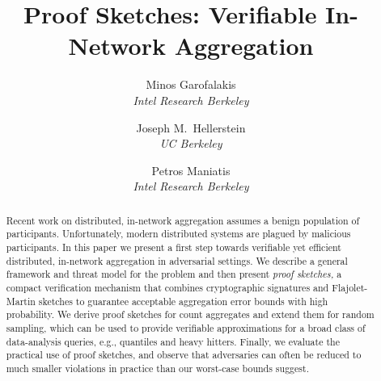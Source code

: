 \documentclass[10pt,twocolumn]{article}
\title{\vspace*{-32pt}Proof Sketches: Verifiable In-Network Aggregation}
\author{Minos Garofalakis\\
\emph{Intel Research Berkeley}\\
\and
Joseph M.\ Hellerstein\\
\emph{UC Berkeley}\\
\and
Petros Maniatis\\
\emph{Intel Research Berkeley}\\
}
\newcommand{\comm}[2]{[{\textbf{\color{green}#1:}}{\color{red}\textit{#2}}]}
\renewcommand{\comm}[2]{}
\newcommand{\proofsketches}{proof sketches\xspace}
\newcommand{\eat}[1]{}
\begin{document}
\date{}
\maketitle

\begin{abstract}
\vspace*{-1em}
Recent work on distributed, in-network aggregation assumes a benign population
  of participants.  Unfortunately, modern distributed systems are
  plagued by malicious participants.  In this paper we present a
  first step towards verifiable yet efficient
  distributed, in-network aggregation in adversarial settings.
  We
  describe a general framework and threat model for the problem and then present
  \emph{\proofsketches,} a compact verification mechanism
  that combines 
  cryptographic signatures and Flajolet-Martin sketches to guarantee
  acceptable aggregation error bounds with high
  probability.
%
%
We derive \proofsketches for count
aggregates and extend them for random sampling,
which can be used to provide verifiable approximations 
for a broad class of data-analysis queries, e.g., quantiles and 
heavy hitters.
Finally, we evaluate the practical use of \proofsketches, and observe that
adversaries can often be reduced to much smaller violations
in practice than our worst-case bounds suggest.
%
\eat{
{\comm{JMH}{Don't forget to comment out this tag!}\\
\tiny
\begin{verb}
$Id: amfm.tex,v 1.176 2006/11/23 02:23:11 maniatis Exp $
\end{verb}
}
}
\end{abstract}

\setlength{\headrulewidth}{0pt}
\thispagestyle{fancy}
\end{document}
